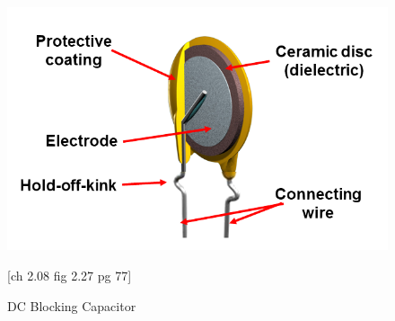 \begin{figure}
\includegraphics[keepaspectratio=true,scale=.5]{./figures/parameters/dcBlocking.png}
\centering
\caption{DC Blocking Capacitor}
\cite{hh}[ch 2.08 fig 2.27 pg 77]
\label{dcBlock}
\end{figure}
